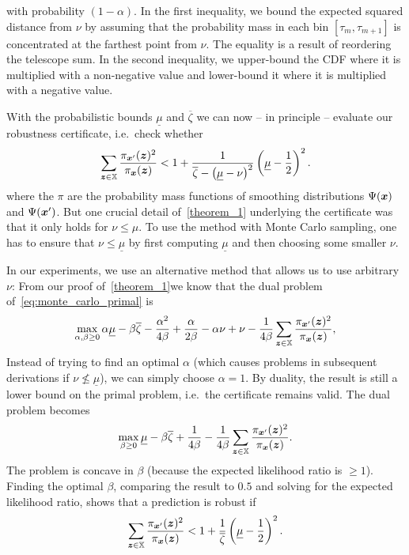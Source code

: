 with probability $(1- \alpha)$.
In the first inequality, we bound the expected squared distance from $\nu$ by assuming that the probability mass in each bin $[\tau_m, \tau_{m+1}]$ is concentrated at the farthest point from $\nu$. The equality is a result of reordering the telescope sum.
In the second inequality, we upper-bound the CDF where it is multiplied with a non-negative value and lower-bound it where it is multiplied with a negative value.

With the probabilistic bounds $\underline{\mu}$ and $\overline{\zeta}$ we can now -- in principle -- evaluate our robustness certificate, i.e.~check whether
\begin{equation}
 \sum_{{\bm{z}} \in {\mathbb{X}}} \frac{\pi_{{\bm{x}}'}({\bm{z}})^2}{\pi_{{\bm{x}}}({\bm{z}})}    <
    1 + 
    \frac{1}{\overline{\zeta} - \left(\underline{\mu} - \nu\right)^2}
    \left(  \underline{\mu} - \frac{1}{2} \right)^2.
\end{equation}
where the $\pi$ are the probability mass functions of smoothing distributions $\Psi({\bm{x}})$ and $\Psi({\bm{x}}')$.
But one crucial detail of~\autoref{theorem_1} underlying the certificate was that it only holds for $\nu \leq \mu$.
To use the method with Monte Carlo sampling, one has to ensure that $\nu \leq \underline{\mu}$ by first computing $\underline{\mu}$ and then choosing some smaller $\nu$.

In our experiments, we use an alternative method that allows us to use arbitrary $\nu$:
From our proof of~\autoref{theorem_1}we know that the dual problem of~\autoref{eq:monte_carlo_primal} is 
\begin{equation}
    \max_{\alpha,\beta \geq 0} \alpha \underline{\mu} - \beta \overline{\zeta}
    - \frac{\alpha^2}{4 \beta} + \frac{\alpha}{2 \beta} - \alpha \nu + \nu
    - \frac{1}{4 \beta}
    \sum_{{\bm{z}} \in {\mathbb{X}}}
    \frac{\pi_{{\bm{x}}'}({\bm{z}})^2}{\pi_{{\bm{x}}}({\bm{z}})},
\end{equation}
Instead of trying to find an optimal $\alpha$ (which causes problems in subsequent derivations if $\nu \nleq \underline{\mu}$), we can simply choose $\alpha=1$.
By duality, the result is still a lower bound on the primal problem, i.e.~the certificate remains valid.
The dual problem becomes
\begin{equation}
    \max_{\beta \geq 0}  \underline{\mu} - \beta \overline{\zeta}
    + \frac{1}{4 \beta} 
    - \frac{1}{4 \beta}
    \sum_{{\bm{z}} \in {\mathbb{X}}}
    \frac{\pi_{{\bm{x}}'}({\bm{z}})^2}{\pi_{{\bm{x}}}({\bm{z}})}.
\end{equation}
The problem is concave in $\beta$ (because the expected likelihood ratio is $\geq 1$). Finding the optimal $\beta$, comparing the result to $0.5$ and solving for the expected likelihood ratio, shows that a prediction is robust if 
\begin{equation}
 \sum_{{\bm{z}} \in {\mathbb{X}}} \frac{\pi_{{\bm{x}}'}({\bm{z}})^2}{\pi_{{\bm{x}}}({\bm{z}})}    <
    1 + 
    \frac{1}{\overline{\zeta}}
    \left(  \underline{\mu} - \frac{1}{2} \right)^2.
\end{equation}

